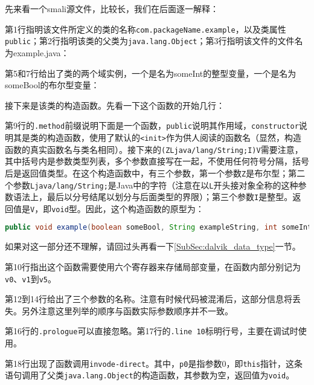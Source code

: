 先来看一个smali源文件，比较长，我们在后面逐一解释：


第1行指明该文件所定义的类的名称\lstinline!com.packageName.example!，以及类属性\lstinline!public!；第2行指明该类的父类为\lstinline!java.lang.Object!；第3行指明该文件的文件名为example.java：


第5和7行给出了类的两个域实例，一个是名为someInt的整型变量，一个是名为someBool的布尔型变量：


接下来是该类的构造函数。先看一下这个函数的开始几行：

第9行的\lstinline!.method!前缀说明下面是一个函数，\lstinline!public!说明其作用域，\lstinline!constructor!说明其是类的构造函数，使用了默认的\lstinline!<init>!作为供人阅读的函数名（显然，构造函数的真实函数名与类名相同）。接下来的\lstinline!(ZLjava/lang/String;I)V!需要注意，其中括号内是参数类型列表，多个参数直接写在一起，不使用任何符号分隔，括号后是返回值类型。在这个构造函数中，有三个参数，第一个参数\lstinline!Z!是布尔型；第二个参数\lstinline!Ljava/lang/String;!是Java中的字符（注意在以\lstinline!L!开头接对象全称的这种参数语法上，最后以分号结尾以划分与后面类型的界限）；第三个参数\lstinline!I!是整型。返回值是\lstinline!V!，即\lstinline!void!型。因此，这个构造函数的原型为：
\begin{lstlisting}[language=java, numbers=none]
public void example(boolean someBool, String exampleString, int someInt);
\end{lstlisting}
如果对这一部分还不理解，请回过头再看一下\ref{SubSec:dalvik_data_type}一节。

第10行指出这个函数需要使用六个寄存器来存储局部变量，在函数内部分别记为\lstinline!v0!、\lstinline!v1!到\lstinline!v5!。

第12到14行给出了三个参数的名称。注意有时候代码被混淆后，这部分信息将丢失。另外注意这里列举的顺序与函数实际参数顺序并不一致。


第16行的\lstinline!.prologue!可以直接忽略。第17行的\lstinline!.line 10!标明行号，主要在调试时使用。

第18行出现了函数调用\lstinline!invode-direct!。其中，\lstinline!p0!是指参数0，即\lstinline!this!指针，这条语句调用了父类\lstinline!java.lang.Object!的构造函数，其参数为空，返回值为\lstinline!void!。

